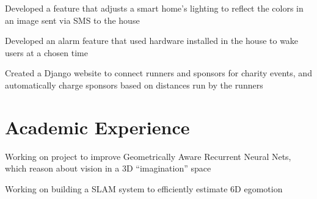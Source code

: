\documentclass[letterpaper]{deedy-resume} %
\begin{document}
\begin{minipage}[t]{0.66\textwidth}


\begin{tightitemize}
    \item Developed a feature that adjusts a smart home's lighting to reflect the colors in an image sent via SMS to the house
    \item Developed an alarm feature that used hardware installed in the house to wake users at a chosen time
\end{tightitemize}

\sectionspace %


\begin{tightitemize}
    \item Created a Django website to connect runners and sponsors for charity events, and automatically charge sponsors based on distances run by the runners
\end{tightitemize}

\sectionspace %


\section{Academic Experience}


\begin{tightitemize}
  \item Working on project to improve Geometrically Aware Recurrent Neural Nets, which reason about vision in a 3D ``imagination'' space
  \item Working on building a SLAM system to efficiently estimate 6D egomotion
\end{tightitemize}


\end{minipage}
\end{document}
